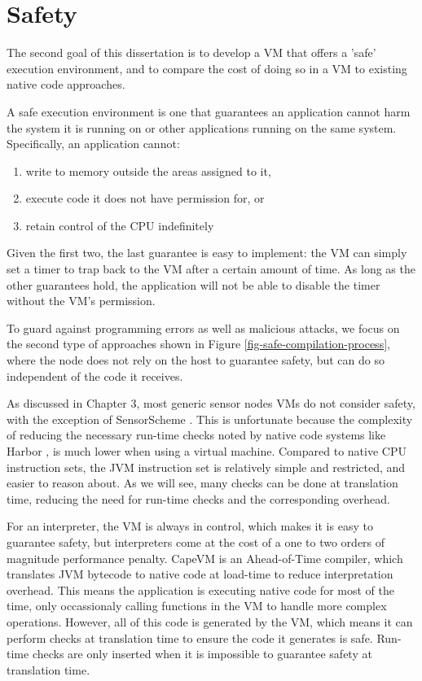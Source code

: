 \chapter{Safety}
\label{sec-safety}


The second goal of this dissertation is to develop a VM that offers a 'safe' execution environment, and to compare the cost of doing so in a VM to existing native code approaches.

A safe execution environment is one that guarantees an application cannot harm the system it is running on or other applications running on the same system. Specifically, an application cannot:
\begin{enumerate}
	\item write to memory outside the areas assigned to it,
	\item execute code it does not have permission for, or
	\item retain control of the CPU indefinitely
\end{enumerate}

Given the first two, the last guarantee is easy to implement: the VM can simply set a timer to trap back to the VM after a certain amount of time. As long as the other guarantees hold, the application will not be able to disable the timer without the VM's permission.

To guard against programming errors as well as malicious attacks, we focus on the second type of approaches shown in Figure \ref{fig-safe-compilation-process}, where the node does not rely on the host to guarantee safety, but can do so independent of the code it receives.

As discussed in Chapter 3, most generic sensor nodes VMs do not consider safety, with the exception of SensorScheme \cite{Evers:2010ur}. This is unfortunate because the complexity of reducing the necessary run-time checks noted by native code systems like Harbor \cite{Kumar:2007ge}, is much lower when using a virtual machine. Compared to native CPU instruction sets, the JVM instruction set is relatively simple and restricted, and easier to reason about. As we will see, many checks can be done at translation time, reducing the need for run-time checks and the corresponding overhead.

For an interpreter, the VM is always in control, which makes it is easy to guarantee safety, but interpreters come at the cost of a one to two orders of magnitude performance penalty. CapeVM is an Ahead-of-Time compiler, which translates JVM bytecode to native code at load-time to reduce interpretation overhead. This means the application is executing native code for most of the time, only occassionaly calling functions in the VM to handle more complex operations. However, all of this code is generated by the VM, which means it can perform checks at translation time to ensure the code it generates is safe. Run-time checks are only inserted when it is impossible to guarantee safety at translation time.

